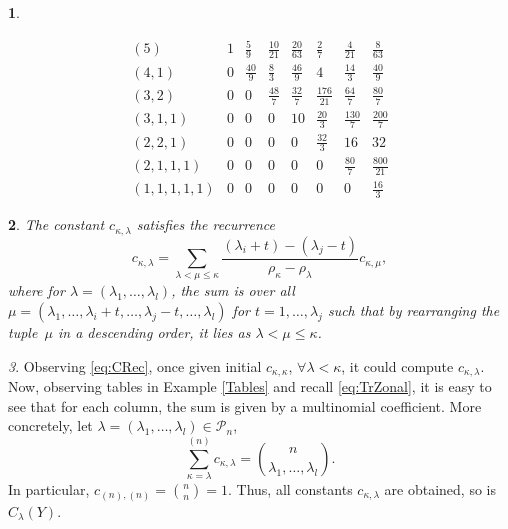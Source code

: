 \documentclass[10pt,oneside,american]{amsart}
\numberwithin{equation}{section}
\numberwithin{figure}{section}
\theoremstyle{plain}
\newtheorem{thm}{\protect\theoremname}[section]
\theoremstyle{definition}
\theoremstyle{remark}
\newtheorem{rem}[thm]{\protect\remarkname}
\theoremstyle{plain}
\theoremstyle{definition}
\newtheorem{example}[thm]{\protect\examplename}
\theoremstyle{plain}
\theoremstyle{plain}
\providecommand{\examplename}{Example}
\providecommand{\remarkname}{Remark}
\providecommand{\theoremname}{Theorem}
\begin{document}
\begin{example}
\begin{itemize}
\[\begin{array}{c|ccccccc}
\left(5\right) & 1 & \frac{5}{9} & \frac{10}{21} & \frac{20}{63} & \frac{2}{7} & \frac{4}{21} & \frac{8}{63}\\
\left(4,1\right) & 0 & \frac{40}{9} & \frac{8}{3} & \frac{46}{9} & 4 & \frac{14}{3} & \frac{40}{9}\\
\left(3,2\right) & 0 & 0 & \frac{48}{7} & \frac{32}{7} & \frac{176}{21} & \frac{64}{7} & \frac{80}{7}\\
\left(3,1,1\right) & 0 & 0 & 0 & 10 & \frac{20}{3} & \frac{130}{7} & \frac{200}{7}\\
\left(2,2,1\right) & 0 & 0 & 0 & 0 & \frac{32}{3} & 16 & 32\\
\left(2,1,1,1\right) & 0 & 0 & 0 & 0 & 0 & \frac{80}{7} & \frac{800}{21}\\
\left(1,1,1,1,1\right) & 0 & 0 & 0 & 0 & 0 & 0 & \frac{16}{3}
\end{array}
\]
\end{itemize}
\end{example}
\begin{thm}
The constant $c_{\kappa,\lambda}$ satisfies the recurrence \cite[pp.~234, eq.~14]{Muirhead}
\begin{equation}
c_{\kappa,\lambda}=\sum_{\lambda<\mu\leq\kappa}\frac{\left(\lambda_{i}+t\right)-\left(\lambda_{j}-t\right)}{\rho_{\kappa}-\rho_{\lambda}}c_{\kappa,\mu},\label{eq:CRec}
\end{equation}
where for $\lambda=\left(\lambda_{1},\ldots,\lambda_{l}\right)$,
the sum is over all $\mu=\left(\lambda_{1},\ldots,\lambda_{i}+t,\ldots,\lambda_{j}-t,\ldots,\lambda_{l}\right)$
for $t=1,\ldots,\lambda_{j}$ such that by rearranging the tuple~$\mu$
in a descending order, it lies as $\lambda<\mu\leq\kappa$.
\end{thm}
\begin{rem}
Observing \eqref{eq:CRec}, once given initial $c_{\kappa,\kappa}$,
$\forall\lambda<\kappa$, it could compute $c_{\kappa,\lambda}$.
Now, observing tables in Example \ref{Tables} and recall \eqref{eq:TrZonal},
it is easy to see that for each column, the sum is given by a multinomial
coefficient. More concretely, let $\lambda=\left(\lambda_{1},\ldots,\lambda_{l}\right)\in\mathcal{P}_{n}$,
\begin{equation}
  \sum_{\kappa=\lambda}^{\left(n\right)}c_{\kappa,\lambda}=\binom{n}{\lambda_{1},\ldots,\lambda_{l}}.\label{eq:CInitial}
\end{equation}
In particular, $c_{\left(n\right),\left(n\right)}=\binom{n}{n}=1$.
Thus, all constants $c_{\kappa,\lambda}$ are obtained, so is $C_{\lambda}(Y)$. 
\end{rem}
\end{document}
